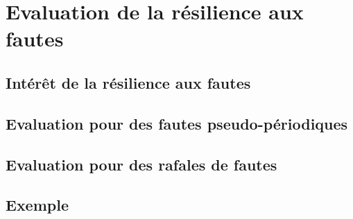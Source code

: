 \section{Evaluation de la résilience aux fautes}
\label{sec:contribution_tf-ordo_resilience}

\subsection{Intérêt de la résilience aux fautes}
\subsection{Evaluation pour  des fautes pseudo-périodiques}
\subsection{Evaluation pour  des rafales de fautes}
\subsection{Exemple}



